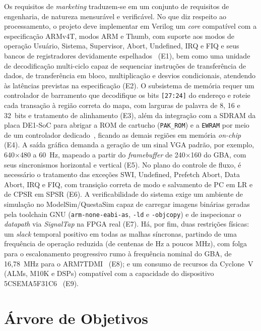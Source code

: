 \documentclass[pnumromarab,times]{politex}
\begin{document}
Os requisitos de \emph{marketing} traduzem-se em um conjunto de
requisitos de engenharia, de natureza mensurável e verificável. No
que diz respeito ao processamento, o projeto deve implementar em
Verilog um \emph{core} compatível com a especificação ARMv4T,
modos ARM e Thumb, com suporte aos modos de operação Usuário,
Sistema, Supervisor, Abort, Undefined, IRQ e FIQ e seus bancos de
registradores devidamente espelhados~\cite{ARM_DDI0210B} (E1), bem
como uma unidade de decodificação multi-ciclo capaz de sequenciar
instruções de transferência de dados, de transferência em bloco,
multiplicação e desvios condicionais, atendendo às latências
previstas na especificação (E2). O subsistema de memória requer um
controlador de barramento que decodifique os bits \texttt{[27:24]} do
endereço e roteie cada transação à região correta do mapa, com
larguras de palavra de 8, 16 e 32~bits e tratamento de alinhamento
(E3), além da integração com a SDRAM da placa DE1-SoC para abrigar a
ROM de cartucho (\texttt{PAK\_ROM}) e a \texttt{EWRAM} por meio de um
controlador dedicado~\cite{CycloneV}, ficando as demais regiões em
memória \textit{on-chip} (E4). A saída gráfica demanda a geração de um
sinal VGA padrão, por exemplo, 640$\times$480 a 60~Hz, mapeado a
partir do \textit{framebuffer} de 240$\times$160 do GBA, com seus
sincronismos horizontal e vertical (E5). No plano do controle de
fluxo, é necessário o tratamento das exceções SWI, Undefined,
Prefetch Abort, Data Abort, IRQ e FIQ, com transição correta de modo
e salvamento de PC em LR e de CPSR em SPSR (E6). A verificabilidade do
sistema exige um ambiente de simulação no ModelSim/QuestaSim capaz de
carregar imagens binárias geradas pela toolchain GNU
(\texttt{arm-none-eabi-as}, \texttt{-ld} e \texttt{-objcopy}) e de
inspecionar o \textit{datapath} via \emph{SignalTap} na FPGA real
(E7). Há, por fim, duas restrições físicas: um \textit{slack} temporal
positivo em todas as malhas síncronas, partindo de uma frequência de
operação reduzida (de centenas de Hz a poucos MHz), com folga para o
escalonamento progressivo rumo à frequência nominal do GBA, de
16{,}78~MHz para o ARM7TDMI~\cite{Copetti2019} (E8); e um consumo de
recursos da Cyclone~V (ALMs, M10K e DSPs) compatível com a capacidade
do dispositivo \mbox{5CSEMA5F31C6}~\cite{CycloneV,TerasicDE1SoC} (E9).


\section{Árvore de Objetivos}
\label{sec:arvore-objetivos}
\end{document}
